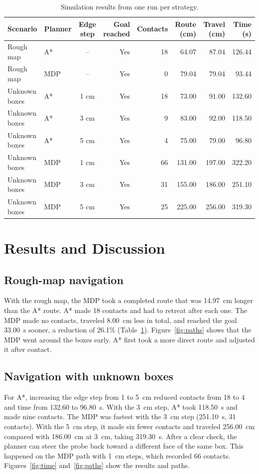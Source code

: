 \documentclass[letterpaper,journal]{IEEEtran}
\begin{document}
\begin{table}[!t]
\centering
\caption{Simulation results from one run per strategy.}
\label{tab:results}
\begin{tabular}{@{}llcrrrrr@{}}
\toprule
Scenario & Planner & Edge step & Goal reached & Contacts & Route (cm) & Travel (cm) & Time (s)\\
\midrule
Rough map & A* & -- & Yes & 18 & 64.07 & 87.04 & 126.44\\
Rough map & MDP & -- & Yes & 0 & 79.04 & 79.04 & 93.44\\
\midrule
Unknown boxes & A* & 1 cm & Yes & 18 & 73.00 & 91.00 & 132.60\\
Unknown boxes & A* & 3 cm & Yes & 9 & 83.00 & 92.00 & 118.50\\
Unknown boxes & A* & 5 cm & Yes & 4 & 75.00 & 79.00 & 96.80\\
Unknown boxes & MDP & 1 cm & Yes & 66 & 131.00 & 197.00 & 322.20\\
Unknown boxes & MDP & 3 cm & Yes & 31 & 155.00 & 186.00 & 251.10\\
Unknown boxes & MDP & 5 cm & Yes & 25 & 225.00 & 256.00 & 319.30\\
\bottomrule
\end{tabular}
\end{table}

\section{Results and Discussion}

\subsection{Rough-map navigation}

With the rough map, the MDP took a completed route that was 14.97~cm longer than the A* route. A* made 18 contacts and had to retreat after each one. The MDP made no contacts, traveled 8.00~cm less in total, and reached the goal 33.00~s sooner, a reduction of 26.1\% (Table~\ref{tab:results}). Figure~\ref{fig:paths} shows that the MDP went around the boxes early. A* first took a more direct route and adjusted it after contact.

\subsection{Navigation with unknown boxes}

For A*, increasing the edge step from 1 to 5~cm reduced contacts from 18 to 4 and time from 132.60 to 96.80~s. With the 3~cm step, A* took 118.50~s and made nine contacts. The MDP was fastest with the 3~cm step (251.10~s, 31 contacts). With the 5~cm step, it made six fewer contacts and traveled 256.00~cm compared with 186.00~cm at 3~cm, taking 319.30~s. After a clear check, the planner can steer the probe back toward a different face of the same box. This happened on the MDP path with 1~cm steps, which recorded 66 contacts. Figures~\ref{fig:time} and~\ref{fig:paths} show the results and paths.
\end{document}
